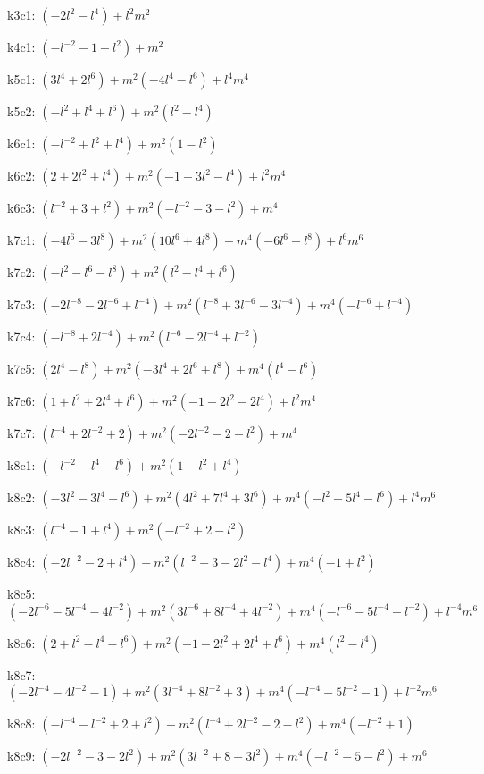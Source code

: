 k3c1: $ (-2l^{2}-l^{4})  +l^{2}m^{2} $ 

k4c1: $ (-l^{-2}-1-l^{2})  +m^{2} $ 

k5c1: $ (3l^{4}+2l^{6})  +m^{2}(-4l^{4}-l^{6})  +l^{4}m^{4} $ 

k5c2: $ (-l^{2}+l^{4}+l^{6})  +m^{2}(l^{2}-l^{4}) $ 

k6c1: $ (-l^{-2}+l^{2}+l^{4})  +m^{2}(1-l^{2}) $ 

k6c2: $ (2+2l^{2}+l^{4})  +m^{2}(-1-3l^{2}-l^{4})  +l^{2}m^{4} $ 

k6c3: $ (l^{-2}+3+l^{2})  +m^{2}(-l^{-2}-3-l^{2})  +m^{4} $ 

k7c1: $ (-4l^{6}-3l^{8})  +m^{2}(10l^{6}+4l^{8})  +m^{4}(-6l^{6}-l^{8})  +l^{6}m^{6} $ 

k7c2: $ (-l^{2}-l^{6}-l^{8})  +m^{2}(l^{2}-l^{4}+l^{6}) $ 

k7c3: $ (-2l^{-8}-2l^{-6}+l^{-4})  +m^{2}(l^{-8}+3l^{-6}-3l^{-4})  +m^{4}(-l^{-6}+l^{-4}) $ 

k7c4: $ (-l^{-8}+2l^{-4})  +m^{2}(l^{-6}-2l^{-4}+l^{-2}) $ 

k7c5: $ (2l^{4}-l^{8})  +m^{2}(-3l^{4}+2l^{6}+l^{8})  +m^{4}(l^{4}-l^{6}) $ 

k7c6: $ (1+l^{2}+2l^{4}+l^{6})  +m^{2}(-1-2l^{2}-2l^{4})  +l^{2}m^{4} $ 

k7c7: $ (l^{-4}+2l^{-2}+2)  +m^{2}(-2l^{-2}-2-l^{2})  +m^{4} $ 

k8c1: $ (-l^{-2}-l^{4}-l^{6})  +m^{2}(1-l^{2}+l^{4}) $ 

k8c2: $ (-3l^{2}-3l^{4}-l^{6})  +m^{2}(4l^{2}+7l^{4}+3l^{6})  +m^{4}(-l^{2}-5l^{4}-l^{6})  +l^{4}m^{6} $ 

k8c3: $ (l^{-4}-1+l^{4})  +m^{2}(-l^{-2}+2-l^{2}) $ 

k8c4: $ (-2l^{-2}-2+l^{4})  +m^{2}(l^{-2}+3-2l^{2}-l^{4})  +m^{4}(-1+l^{2}) $ 

k8c5: $ (-2l^{-6}-5l^{-4}-4l^{-2})  +m^{2}(3l^{-6}+8l^{-4}+4l^{-2})  +m^{4}(-l^{-6}-5l^{-4}-l^{-2})  +l^{-4}m^{6} $ 

k8c6: $ (2+l^{2}-l^{4}-l^{6})  +m^{2}(-1-2l^{2}+2l^{4}+l^{6})  +m^{4}(l^{2}-l^{4}) $ 

k8c7: $ (-2l^{-4}-4l^{-2}-1)  +m^{2}(3l^{-4}+8l^{-2}+3)  +m^{4}(-l^{-4}-5l^{-2}-1)  +l^{-2}m^{6} $ 

k8c8: $ (-l^{-4}-l^{-2}+2+l^{2})  +m^{2}(l^{-4}+2l^{-2}-2-l^{2})  +m^{4}(-l^{-2}+1) $ 

k8c9: $ (-2l^{-2}-3-2l^{2})  +m^{2}(3l^{-2}+8+3l^{2})  +m^{4}(-l^{-2}-5-l^{2})  +m^{6} $ 

